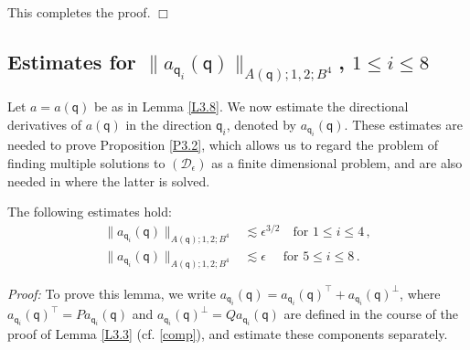 \documentclass[11pt]{article}
\numberwithin{equation}{section} \setlength{\topmargin}{-35pt}
\newcommand{\PP}{\mathcal{P}}
\newcommand{\q}{\mathsf{q}}
\begin{document}
This completes the proof. \hfill$\Box$

\subsection{Estimates for $\|a_{\q_i}(\q)\|_{A(\q);1,2;B^4}$, $1\leq i\leq 8$}

Let $a=a(\q)$ be as in Lemma \ref{L3.8}. We now estimate the
directional derivatives of $a(\q)$ in the direction $\q_i$, denoted
by $a_{\q_i}(\q)$. These estimates are needed to prove Proposition
\ref{P3.2}, which allows us to regard the problem of finding
multiple solutions to $(\mathcal D_\epsilon)$ as a finite
dimensional problem, and are also needed in \cite{IM2} where the
latter is solved.
\begin{lemma}
\label{L3.9} The following estimates hold:
\begin{align}
\|a_{\q_i}(\q)\|_{A(\q);1,2;B^4}&\lesssim\epsilon^{3/2}\quad \mbox{
for } 1\le
i\le 4\,,\\
\|a_{\q_i}(\q)\|_{A(\q);1,2;B^4}&\lesssim\epsilon\quad \mbox { for }
5\le i\le 8\,.
\end{align}
\end{lemma}
\textit {Proof:} To prove this lemma,  we write
$a_{\q_i}(\q)=a_{\q_i}(\q)^{\intercal}+a_{\q_i}(\q)^{\perp}$, where
$a_{\q_i}(\q)^{\intercal}=Pa_{\q_i}(\q)$ and
$a_{\q_i}(\q)^{\perp}=Qa_{\q_i}(\q)$ are defined in the course of
the proof of Lemma \ref{L3.3} (cf. \eqref{comp}), and estimate these
components separately.
\end{document}
